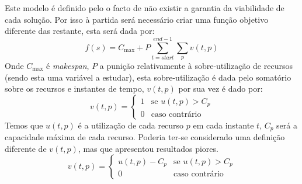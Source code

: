 Este modelo é definido pelo o facto de não existir a garantia da viabilidade de cada solução. Por isso à partida será necessário criar uma função objetivo diferente das restante, esta será dada por:
$$f(s) = C_{\max} + P \sum_{t=start}^{end-1}\sum_{p}v(t,p)$$
Onde $C_{\max}$ é \textit{makespan}, $P$ a punição relativamente à sobre-utilização de recursos (sendo esta uma variável a estudar), esta sobre-utilização é dada pelo somatório sobre os recursos e instantes de tempo, $v(t,p)$ por sua vez é dado por:
$$
v(t,p)=
\begin{cases}
	1 & \text{se } u(t,p)>C_{p}\\
	0 & \text{caso contrário}
\end{cases}
$$
Temos que $u(t,p)$ é a utilização de cada recurso $p$ em cada instante $t$, $C_{p}$ será a capacidade máxima de cada recurso. Poderia ter-se considerado uma definição diferente de $v(t,p)$, mas que apresentou resultados piores.\\
$$
v(t,p)=
\begin{cases}
	u(t,p)-C_{p} & \text{se } u(t,p)>C_{p}\\
	0            & \text{caso contrário}
\end{cases}
$$

